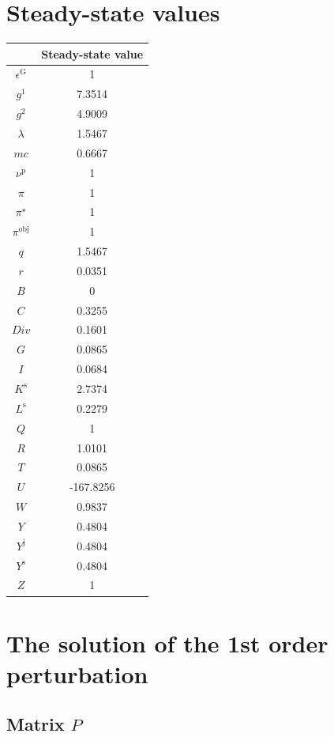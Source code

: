 

\section{Steady-state values}


\begin{tabular}{c|c|}
  & Steady-state value\\
\hline
$\epsilon^{\mathrm{G}}$ & 1 \\
$g^{\mathrm{1}}$ & 7.3514 \\
$g^{\mathrm{2}}$ & 4.9009 \\
$\lambda$ & 1.5467 \\
${m\!c}$ & 0.6667 \\
$\nu^{\mathrm{p}}$ & 1 \\
$\pi$ & 1 \\
$\pi^{\star}$ & 1 \\
$\pi^{\mathrm{obj}}$ & 1 \\
$q$ & 1.5467 \\
$r$ & 0.0351 \\
$B$ & 0 \\
$C$ & 0.3255 \\
${D\!i\!v}$ & 0.1601 \\
$G$ & 0.0865 \\
$I$ & 0.0684 \\
$K^{\mathrm{s}}$ & 2.7374 \\
$L^{\mathrm{s}}$ & 0.2279 \\
$Q$ & 1 \\
$R$ & 1.0101 \\
$T$ & 0.0865 \\
$U$ & -167.8256 \\
$W$ & 0.9837 \\
$Y$ & 0.4804 \\
$Y^{\mathrm{j}}$ & 0.4804 \\
$Y^{\mathrm{s}}$ & 0.4804 \\
$Z$ & 1 \\
\hline
\end{tabular}


\section{The solution of the 1st order perturbation}

\subsection*{Matrix $P$}

